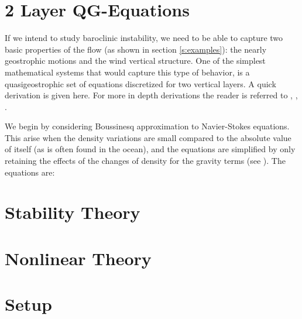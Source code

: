 \section{2 Layer QG-Equations}
\label{s:qg}
If we intend to study baroclinic instability, we need to be able to capture two basic properties of the flow (as shown in section \ref{s:examples}): the nearly geostrophic motions and the wind vertical structure. One of the simplest mathematical systems that would capture this type of behavior, is a quasigeostrophic set of equations discretized for two vertical layers. A quick derivation is given here. For more in depth derivations the  reader is referred to , , .

We begin by considering Boussinesq approximation to Navier-Stokes equations. This arise when the density variations are small compared to the absolute value of itself (as is often found in the ocean), and the equations are simplified by only retaining the effects of the changes of density for the gravity terms (see ). The equations are:




\section{Stability Theory}
\label{s:stability}
\section{Nonlinear Theory}
\label{s:nonlinear}
\section{Setup}
\label{s:setup}
